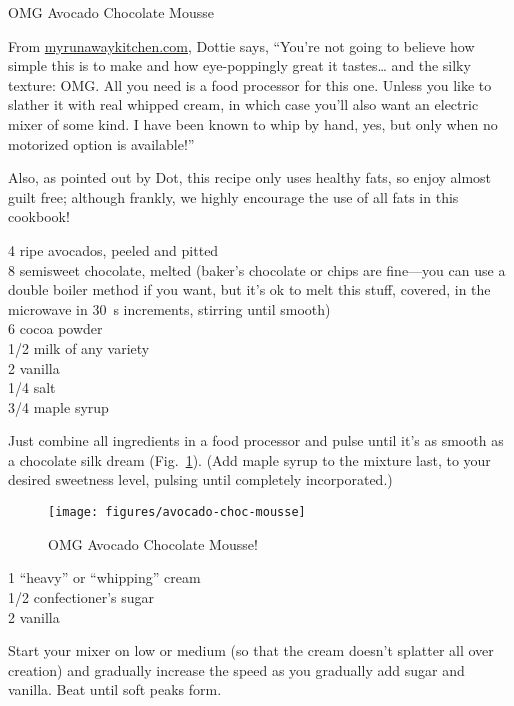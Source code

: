 \begin{entry}{OMG Avocado Chocolate Mousse}

\begin{open}
  From \url{myrunawaykitchen.com}, Dottie says, ``You’re not going to believe
  how simple this is to make and how eye-poppingly great it tastes… and the
  silky texture: OMG.  All you need is a food processor for this one.  Unless
  you like to slather it with real whipped cream, in which case you’ll also
  want an electric mixer of some kind.  I have been known to whip by hand,
  yes, but only when no motorized option is available!''

  Also, as pointed out by Dot, this recipe only uses healthy fats, so enjoy
  almost guilt free; although frankly, we highly encourage the use of all fats
  in this cookbook!
\end{open}
\begin{ingredients}
    4 ripe avocados, peeled and pitted\\
    \SI{8}{\ounce} semisweet chocolate, melted (baker’s chocolate or chips are fine---you can use a double boiler method if you want, but it's ok to melt this stuff, covered, in the microwave in \SI{30}{\second} increments, stirring until smooth)\\
    \SI{6}{\tblspoon} cocoa powder\\
    \SI{1/2}{\cup} milk of any variety\\
    \SI{2}{\teaspoon} vanilla\\
    \SI{1/4}{\teaspoon} salt\\
    \SI{3/4}{\cup} maple syrup
\end{ingredients}
Just combine all ingredients in a food processor and pulse until it’s as smooth
as a chocolate silk dream (Fig.~\ref{fig:mousse}).  (Add maple syrup to the
mixture last, to your desired sweetness level, pulsing until completely
incorporated.)
\begin{figure}
    \centering
    \texttt{[image: figures/avocado-choc-mousse]}
    \caption{OMG Avocado Chocolate Mousse!}
    \label{fig:mousse}
\end{figure}


\begin{ingredients}
    \SI{1}{\quart} ``heavy'' or ``whipping'' cream\\
    \SI{1/2}{\cup} confectioner's sugar\\
    \SI{2}{\teaspoon} vanilla
\end{ingredients}
Start your mixer on low or medium (so that the cream doesn't splatter all over
creation) and gradually increase the speed as you gradually add sugar and
vanilla.  Beat until soft peaks form.
\end{entry}

